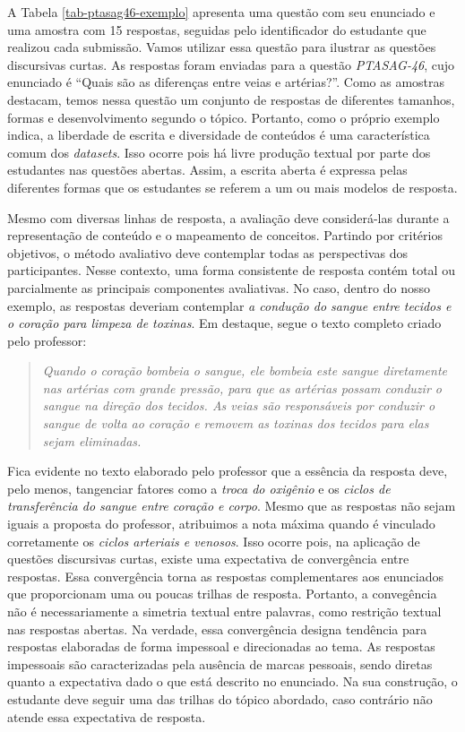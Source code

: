 A Tabela \ref{tab-ptasag46-exemplo} apresenta uma questão com seu enunciado e uma amostra com 15 respostas, seguidas pelo identificador do estudante que realizou cada submissão. Vamos utilizar essa questão para ilustrar as questões discursivas curtas. As respostas foram enviadas para a questão \textit{PTASAG-46}, cujo enunciado é ``Quais são as diferenças entre veias e artérias?''. Como as amostras destacam, temos nessa questão um conjunto de respostas de diferentes tamanhos, formas e desenvolvimento segundo o tópico. Portanto, como o próprio exemplo indica, a liberdade de escrita e diversidade de conteúdos é uma característica comum dos \textit{datasets}. Isso ocorre pois há livre produção textual por parte dos estudantes nas questões abertas. Assim, a escrita aberta é expressa pelas diferentes formas que os estudantes se referem a um ou mais modelos de resposta. 

Mesmo com diversas linhas de resposta, a avaliação deve considerá-las durante a representação de conteúdo e o mapeamento de conceitos. Partindo por critérios objetivos, o método avaliativo deve contemplar todas as perspectivas dos participantes. Nesse contexto, uma forma consistente de resposta contém total ou parcialmente as principais componentes avaliativas. No caso, dentro do nosso exemplo, as respostas deveriam contemplar \textit{a condução do sangue entre tecidos e o coração para limpeza de toxinas}. Em destaque, segue o texto completo criado pelo professor: 

\begin{quote}
\textit{Quando o coração bombeia o sangue, ele bombeia este sangue diretamente nas artérias com grande pressão, para que as artérias possam conduzir o sangue na direção dos tecidos. As veias são responsáveis por conduzir o sangue de volta ao coração e removem as toxinas dos tecidos para elas sejam eliminadas.}
\end{quote}

Fica evidente no texto elaborado pelo professor que a essência da resposta deve, pelo menos, tangenciar fatores como a \textit{troca do oxigênio} e os \textit{ciclos de transferência do sangue entre coração e corpo}. Mesmo que as respostas não sejam iguais a proposta do professor, atribuimos a nota máxima quando é vinculado corretamente os \textit{ciclos arteriais e venosos}. Isso ocorre pois, na aplicação de questões discursivas curtas, existe uma expectativa de convergência entre respostas. Essa convergência torna as respostas complementares aos enunciados que proporcionam uma ou poucas trilhas de resposta. Portanto, a convegência não é necessariamente a simetria textual entre palavras, como restrição textual nas respostas abertas. Na verdade, essa convergência designa tendência para respostas elaboradas de forma impessoal e direcionadas ao tema. As respostas impessoais são caracterizadas pela ausência de marcas pessoais, sendo diretas quanto a expectativa dado o que está descrito no enunciado. Na sua construção, o estudante deve seguir uma das trilhas do tópico abordado, caso contrário não atende essa expectativa de resposta.


